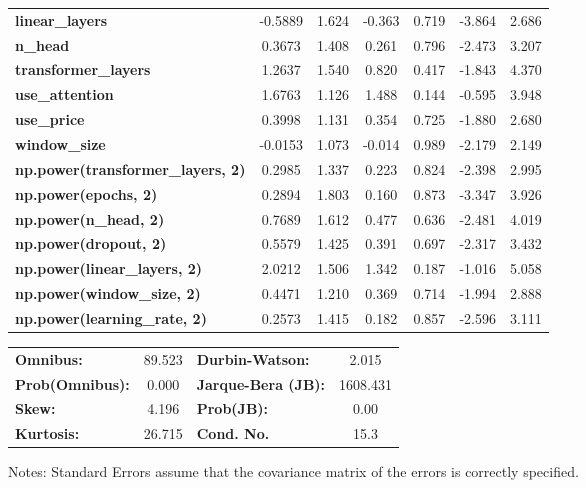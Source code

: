 \begin{center}
\begin{tabular}{lcccccc}
\textbf{linear\_layers}                   &      -0.5889  &        1.624     &    -0.363  &         0.719        &       -3.864    &        2.686     \\
\textbf{n\_head}                          &       0.3673  &        1.408     &     0.261  &         0.796        &       -2.473    &        3.207     \\
\textbf{transformer\_layers}              &       1.2637  &        1.540     &     0.820  &         0.417        &       -1.843    &        4.370     \\
\textbf{use\_attention}                   &       1.6763  &        1.126     &     1.488  &         0.144        &       -0.595    &        3.948     \\
\textbf{use\_price}                       &       0.3998  &        1.131     &     0.354  &         0.725        &       -1.880    &        2.680     \\
\textbf{window\_size}                     &      -0.0153  &        1.073     &    -0.014  &         0.989        &       -2.179    &        2.149     \\
\textbf{np.power(transformer\_layers, 2)} &       0.2985  &        1.337     &     0.223  &         0.824        &       -2.398    &        2.995     \\
\textbf{np.power(epochs, 2)}              &       0.2894  &        1.803     &     0.160  &         0.873        &       -3.347    &        3.926     \\
\textbf{np.power(n\_head, 2)}             &       0.7689  &        1.612     &     0.477  &         0.636        &       -2.481    &        4.019     \\
\textbf{np.power(dropout, 2)}             &       0.5579  &        1.425     &     0.391  &         0.697        &       -2.317    &        3.432     \\
\textbf{np.power(linear\_layers, 2)}      &       2.0212  &        1.506     &     1.342  &         0.187        &       -1.016    &        5.058     \\
\textbf{np.power(window\_size, 2)}        &       0.4471  &        1.210     &     0.369  &         0.714        &       -1.994    &        2.888     \\
\textbf{np.power(learning\_rate, 2)}      &       0.2573  &        1.415     &     0.182  &         0.857        &       -2.596    &        3.111     \\
\bottomrule
\end{tabular}
\begin{tabular}{lclc}
\textbf{Omnibus:}       & 89.523 & \textbf{  Durbin-Watson:     } &    2.015  \\
\textbf{Prob(Omnibus):} &  0.000 & \textbf{  Jarque-Bera (JB):  } & 1608.431  \\
\textbf{Skew:}          &  4.196 & \textbf{  Prob(JB):          } &     0.00  \\
\textbf{Kurtosis:}      & 26.715 & \textbf{  Cond. No.          } &     15.3  \\
\bottomrule
\end{tabular}
\end{center}

Notes: \newline
 [1] Standard Errors assume that the covariance matrix of the errors is correctly specified.